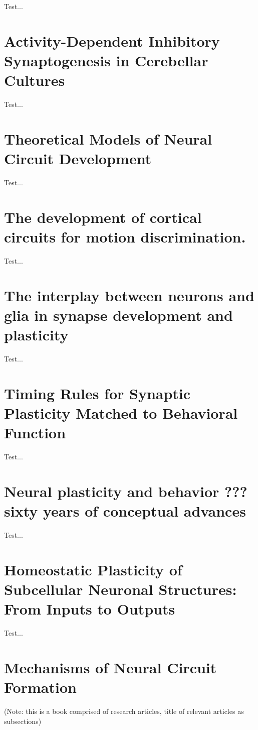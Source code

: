 \documentclass[11pt, a4paper, oneside]{article}   	%
\begin{document}
Test...

\section{Activity-Dependent Inhibitory Synaptogenesis in Cerebellar Cultures \cite{Seil2016}}

Test...

\section{Theoretical Models of Neural Circuit Development \cite{Simpson2009}}

Test...

\section{The development of cortical circuits for motion discrimination. \cite{Smith2015}}

Test...

\section{The interplay between neurons and glia in synapse development and plasticity \cite{Stogsdill2017}}

Test...

\section{Timing Rules for Synaptic Plasticity Matched to Behavioral Function \cite{Suvrathan2016}}

Test...

\section{Neural plasticity and behavior ??? sixty years of conceptual advances \cite{Sweatt2016}}

Test...

\section{Homeostatic Plasticity of Subcellular Neuronal Structures: From Inputs to Outputs \cite{Wefelmeyer2016}}

Test...

\section{Mechanisms of Neural Circuit Formation \cite{Weiner2015}}
(Note: this is a book comprised of research articles, title of relevant articles as subsections)
\end{document}
